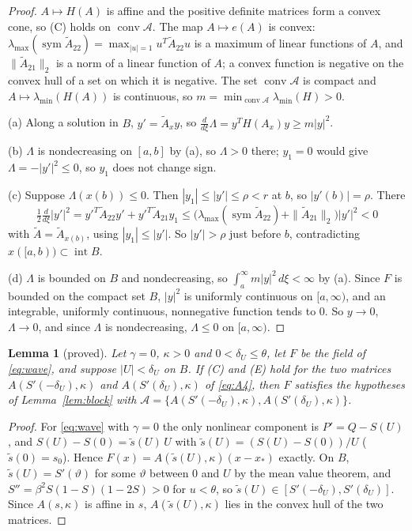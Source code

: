 \documentclass[11pt]{article}
\newtheorem{lemma}{Lemma}[section]
\theoremstyle{definition}
\newcommand{\sym}{\operatorname{sym}}
\newcommand{\xs}{x_*}
\begin{document}
\begin{proof}
$A \mapsto H(A)$ is affine and the positive definite matrices form a convex cone, so (C) holds on $\operatorname{conv}\mathcal{A}$. The map $A \mapsto e(A)$ is convex: $\lambda_{\max}(\sym\tilde A_{22}) = \max_{|u| = 1} u^T\tilde A_{22}u$ is a maximum of linear functions of $A$, and $\|\tilde A_{21}\|_2$ is a norm of a linear function of $A$; a convex function is negative on the convex hull of a set on which it is negative. The set $\operatorname{conv}\mathcal{A}$ is compact and $A \mapsto \lambda_{\min}(H(A))$ is continuous, so $m = \min_{\operatorname{conv}\mathcal{A}}\lambda_{\min}(H) > 0$.

(a) Along a solution in $B$, $y' = \tilde A_x y$, so $\frac{d}{d\xi}\Lambda = y^T H(A_x) y \ge m|y|^2$.

(b) $\Lambda$ is nondecreasing on $[a, b]$ by (a), so $\Lambda > 0$ there; $y_1 = 0$ would give $\Lambda = -|y'|^2 \le 0$, so $y_1$ does not change sign.

(c) Suppose $\Lambda(x(b)) \le 0$. Then $|y_1| \le |y'| \le \rho < r$ at $b$, so $|y'(b)| = \rho$. There
\[
  \tfrac12\tfrac{d}{d\xi}|y'|^2 = y'^T\tilde A_{22}y' + y'^T\tilde A_{21}y_1 \le \bigl(\lambda_{\max}(\sym\tilde A_{22}) + \|\tilde A_{21}\|_2\bigr)|y'|^2 < 0
\]
with $\tilde A = \tilde A_{x(b)}$, using $|y_1| \le |y'|$. So $|y'| > \rho$ just before $b$, contradicting $x([a, b)) \subset \operatorname{int} B$.

(d) $\Lambda$ is bounded on $B$ and nondecreasing, so $\int_a^\infty m|y|^2\, d\xi < \infty$ by (a). Since $F$ is bounded on the compact set $B$, $|y|^2$ is uniformly continuous on $[a, \infty)$, and an integrable, uniformly continuous, nonnegative function tends to $0$. So $y \to 0$, $\Lambda \to 0$, and since $\Lambda$ is nondecreasing, $\Lambda \le 0$ on $[a, \infty)$.
\end{proof}

\begin{lemma}[proved]\label{lem:blockwave}
Let $\gamma = 0$, $\kappa > 0$ and $0 < \delta_U \le \theta$, let $F$ be the field of \eqref{eq:wave}, and suppose $|U| < \delta_U$ on $B$. If (C) and (E) hold for the two matrices $A(S'(-\delta_U), \kappa)$ and $A(S'(\delta_U), \kappa)$ of \eqref{eq:A4}, then $F$ satisfies the hypotheses of Lemma~\ref{lem:block} with $\mathcal{A} = \{A(S'(-\delta_U), \kappa), A(S'(\delta_U), \kappa)\}$.
\end{lemma}

\begin{proof}
For \eqref{eq:wave} with $\gamma = 0$ the only nonlinear component is $P' = Q - S(U)$, and $S(U) - S(0) = \tilde s(U)\, U$ with $\tilde s(U) = (S(U) - S(0))/U$ ($\tilde s(0) = s_0$). Hence $F(x) = A(\tilde s(U), \kappa)(x - \xs)$ exactly. On $B$, $\tilde s(U) = S'(\vartheta)$ for some $\vartheta$ between $0$ and $U$ by the mean value theorem, and $S'' = \beta^2 S(1 - S)(1 - 2S) > 0$ for $u < \theta$, so $\tilde s(U) \in [S'(-\delta_U), S'(\delta_U)]$. Since $A(s, \kappa)$ is affine in $s$, $A(\tilde s(U), \kappa)$ lies in the convex hull of the two matrices.
\end{proof}
\end{document}
